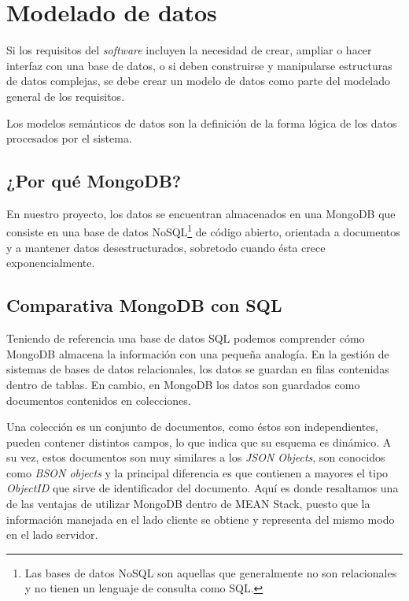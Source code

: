 
\section{Modelado de datos}
Si los requisitos del \textit{software} incluyen la necesidad de crear, ampliar o hacer interfaz con una base de datos, o si deben construirse y manipularse estructuras de datos complejas, se debe crear un modelo de datos como parte del modelado general de los requisitos\cite{pressman}.


Los modelos semánticos de datos son la definición de la forma lógica de los datos procesados por el sistema\cite{sommerville}. 


\subsection{¿Por qué MongoDB?}
En nuestro proyecto, los datos se encuentran almacenados en una MongoDB que consiste en una base de datos NoSQL\footnote{Las bases de datos NoSQL son aquellas que generalmente no son relacionales y no tienen un lenguaje de consulta como SQL.} de código abierto, orientada a documentos y a mantener datos desestructurados, sobretodo cuando ésta crece exponencialmente\cite{mongodb_traspas}. 

\subsection{Comparativa MongoDB con SQL}
Teniendo de referencia una base de datos SQL podemos comprender cómo MongoDB almacena la información con una pequeña analogía. En la gestión de sistemas de bases de datos relacionales, los datos se guardan en filas contenidas dentro de tablas. En cambio, en MongoDB los datos son guardados como documentos contenidos en colecciones.


Una colección es un conjunto de documentos, como éstos son independientes, pueden contener distintos campos, lo que indica que su esquema es dinámico. A su vez, estos documentos son muy similares a los \textit{JSON Objects}, son conocidos como \textit{BSON objects} y la principal diferencia es que contienen a mayores el tipo \textit{ObjectID} que sirve de identificador del documento. Aquí es donde resaltamos una de las ventajas de utilizar MongoDB dentro de MEAN Stack, puesto que la información manejada en el lado cliente se obtiene y representa del mismo modo en el lado servidor.


